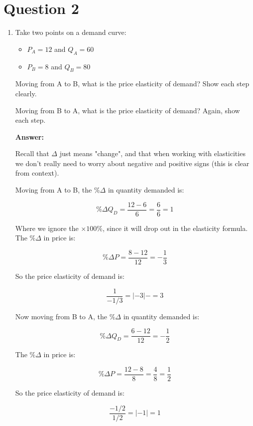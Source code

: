 \documentclass[12pt]{article}
\begin{document}
\section*{Question 2}
\begin{enumerate}
\item Take two points on a demand curve:
\begin{itemize}
    \item $P_A=12$ and $Q_A=60$
    \item $P_B=8$ and $Q_B=80$
\end{itemize}

Moving from A to B, what is the price elasticity of demand? Show each step clearly.

\vspace{2mm}

Moving from B to A, what is the price elasticity of demand? Again, show each step.

\vspace{5mm}

\textbf{Answer:}

\vspace{2mm}

Recall that $\Delta$ just means "change", and that when working with elasticities we don't really need to worry about negative and positive signs (this is clear from context).

\vspace{2mm}

Moving from A to B, the $\% \Delta$ in quantity demanded is:

$$\% \Delta Q_D = \dfrac{12-6}{6} = \dfrac{6}{6} = 1$$

Where we ignore the $\times 100 \%$, since it will drop out in the elasticity formula. The $\% \Delta$ in price is:

$$\% \Delta P = \dfrac{8-12}{12} = -\frac{1}{3} $$

So the price elasticity of demand is:

$$ \dfrac{1}{-1/3} = |-3| -= 3 $$

Now moving from B to A, the $\% \Delta$ in quantity demanded is:

$$\% \Delta Q_D = \dfrac{6-12}{12} = -\frac{1}{2}$$

The $\% \Delta$ in price is:

$$\% \Delta P = \dfrac{12-8}{8} = \dfrac{4}{8} = \dfrac{1}{2} $$

So the price elasticity of demand is:

$$ \frac{-1/2}{1/2} = |-1| = 1 $$ 


\end{enumerate}
\end{document}
